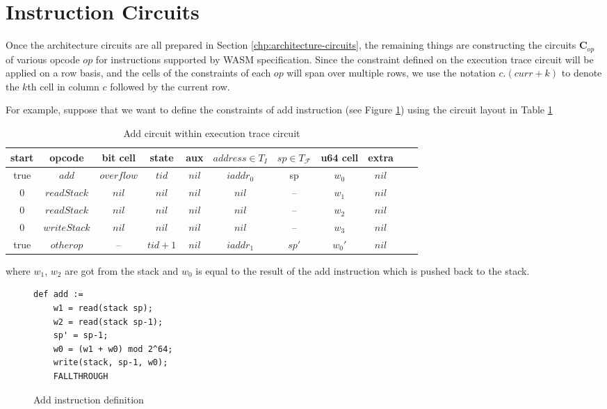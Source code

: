 \section{Instruction Circuits}
\label{chp:instruction-circuits}
Once the architecture circuits are all prepared in Section \ref{chp:architecture-circuits}, the remaining things are constructing the circuits $\mathbf{C}_{op}$ of various opcode $op$ for instructions supported by WASM specification. Since the constraint defined on the execution trace circuit will be applied on a row basis, and the cells of the constraints of each $op$ will span over multiple rows, we use the notation $c.(curr+k)$ to denote the $k$th cell in column $c$ followed by the current row.

For example, suppose that we want to define the constraints of add instruction (see Figure \ref{fig:example-ins}) using the circuit layout in Table \ref{tbl:add-instruction}
\begin{table}[!h]
\begin{center}
\caption{Add circuit within execution trace circuit}
\label{tbl:add-instruction}
\begin{tabular}{ | c | c | c | c | c | c | c | c | c | c | c | }
  \hline
  start & opcode & bit cell & state & aux & $address \in T_{I}$ & $sp \in T_\mathcal{F}$& u64 cell & extra \\ 
  \hline
   true & $add$ & $overflow$ & $tid$ & $nil$ & $iaddr_0$ & sp & $w_0$ & $nil$\\ 
 \hline
   0 & $readStack$ & $nil$ & $nil$ & $nil$ & $nil$ & -- & $w_1$ & $nil$\\ 
 \hline
   0 & $readStack$ & $nil$ & $nil$ & $nil$ & $nil$ & -- & $w_2$ & $nil$\\ 
 \hline
   0 & $writeStack$ & $nil$ & $nil$ & $nil$ & $nil$ & -- & $w_3$ & $nil$\\ 
 \hline
   true & $otherop$ & -- & $tid+1$ & $nil$ & $iaddr_1$ & $sp'$ & $w_0'$ & $nil$\\
 \hline
\end{tabular}

\end{center}
\end{table}
where $w_1$, $w_2$ are got from the stack and $w_0$ is equal to the result of the add instruction which is pushed back to the stack.
\begin{figure}
\small
\centering
\begin{verbatim}
def add :=
    w1 = read(stack sp);
    w2 = read(stack sp-1);
    sp' = sp-1;
    w0 = (w1 + w0) mod 2^64;
    write(stack, sp-1, w0);
    FALLTHROUGH
\end{verbatim}
\caption{Add instruction definition}
\label{fig:example-ins}
\end{figure}
